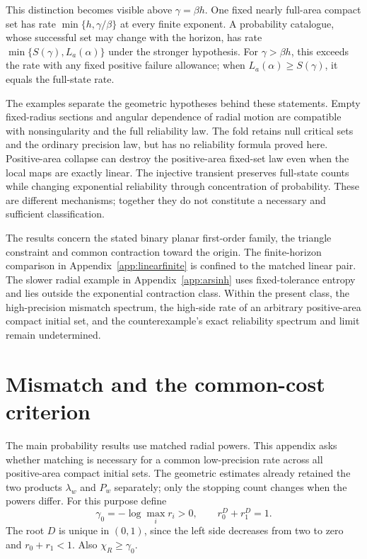 \documentclass[11pt]{amsart}
\theoremstyle{definition}
\theoremstyle{remark}
\numberwithin{equation}{section}
\begin{document}
This distinction becomes visible above $\gamma=\beta h$. One fixed
nearly full-area compact set has rate $\min\{h,\gamma/\beta\}$ at
every finite exponent. A probability catalogue, whose successful set
may change with the horizon, has rate $\min\{S(\gamma),L_a(\alpha)\}$
under the stronger hypothesis. For $\gamma>\beta h$, this exceeds
the rate with any fixed positive failure allowance; when
$L_a(\alpha)\ge S(\gamma)$, it equals the full-state rate.

The examples separate the geometric hypotheses behind these statements.
Empty fixed-radius sections and angular dependence of radial motion
are compatible with nonsingularity and the full reliability law.
The fold retains null critical sets and the ordinary precision law,
but has no reliability formula proved here. Positive-area collapse
can destroy the positive-area fixed-set law even when the local maps
are exactly linear. The injective transient preserves full-state
counts while changing exponential reliability through concentration
of probability. These are different mechanisms; together they do
not constitute a necessary and sufficient classification.

The results concern the stated binary planar first-order family,
the triangle constraint and common contraction toward the origin.
The finite-horizon comparison in Appendix~\ref{app:linearfinite}
is confined to the matched linear pair. The slower radial example
in Appendix~\ref{app:arsinh} uses fixed-tolerance entropy and lies
outside the exponential contraction class. Within the present class,
the high-precision mismatch spectrum, the high-side rate of an
arbitrary positive-area compact initial set, and the counterexample's
exact reliability spectrum and limit remain undetermined.

\appendix

\section{Mismatch and the common-cost criterion}\label{sec:mismatch}

The main probability results use matched radial powers. This appendix asks
whether matching is necessary for a common low-precision rate
across all positive-area compact initial sets. The geometric
estimates already retained the two products $\lambda_w$ and $P_w$
separately; only the stopping count changes when the powers differ.
For this purpose define
\[
\gamma_0=-\log\max_i r_i>0,\qquad r_0^D+r_1^D=1.
\]
The root $D$ is unique in $(0,1)$, since the left side decreases
from two to zero and $r_0+r_1<1$. Also $\chi_R\ge\gamma_0$.
\end{document}
